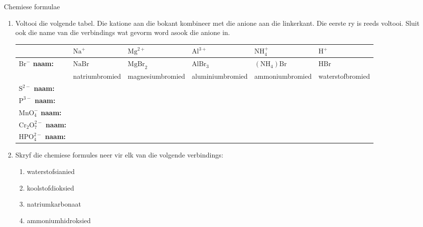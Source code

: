             \begin{exercises}{Chemiese formulae }
            \nopagebreak
        \label{m38689*id145052}\begin{enumerate}[noitemsep, label=\textbf{\arabic*}. ] 
            \label{m38689*uid100}\item 
Voltooi die volgende tabel. Die katione aan die bokant kombineer met die anione aan die linkerkant. Die eerste ry is reeds voltooi. Sluit ook die name van die verbindings wat gevorm word asook die anione in.
          \begin{table}[H]
        \begin{center}
      \label{m38689*id145067}
    \noindent
      \begin{tabular}{|p{1cm}|p{2.5cm}|p{2.5cm}|p{2.5cm}|p{2.5cm}|p{2.5cm}|}\hline
        &\textbf{ $\text{Na}^{+}$} & \textbf{$\text{Mg}^{2+}$} & \textbf{$\text{Al}^{3+}$} & \textbf{$\text{NH}_{4}^{+}$} & \textbf{$\text{H}^{+}$} \\ \hline
\multirow{2}{1cm}{\textbf{$\text{Br}^{-}$ naam:}} & $\text{NaBr}$  & $\text{MgBr}_2$  & $\text{AlBr}_3$  & $(\text{NH}_{4})\text{Br}$  & $\mathrm{HBr}$  \\ 
 & natriumbromied & magnesiumbromied & aluminiumbromied & ammoniumbromied & waterstofbromied \\ \hline
\textbf{$\text{S}^{2-}$ naam:} & & & & & \\ \hline
\textbf{$\text{P}^{3-}$ naam:} & & & & & \\ \hline
\textbf{$\text{MnO}_{4}^{-}$ naam:} & & & & & \\ \hline
\textbf{$\text{Cr}_{2}\text{O}_{7}^{2-}$ naam:} & & & & & \\ \hline
\textbf{$\text{HPO}_{4}^{2-}$ naam:} & & & & & \\ \hline
    \end{tabular}
      \end{center}
\end{table}
    \par
          \label{m38689*uid101}\item Skryf die chemiese formules neer vir elk van die volgende verbindings:
\label{m38689*id145444}\begin{enumerate}[noitemsep, label=\textbf{\alph*}. ] 
            \label{m38689*uid102}\item waterstofsianied
\label{m38689*uid103}\item koolstofdioksied
\label{m38689*uid104}\item natriumkarbonaat
\label{m38689*uid105}\item ammoniumhidroksied

\end{enumerate}
\end{enumerate}
\end{exercises}
